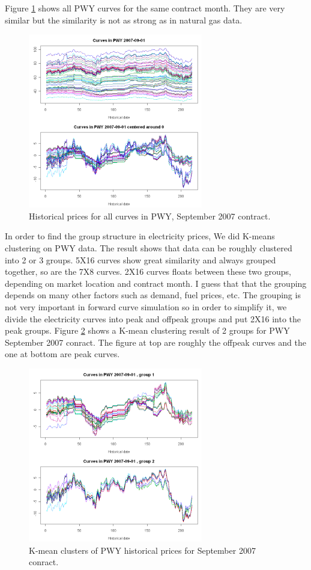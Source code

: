 Figure \ref{pwy-contract} shows all PWY curves for the same contract month.
They are very similar but the similarity is not as strong as in natural
gas data. 
\begin{figure}[htbp]
\centering
\includegraphics[width=3in, height=3in]{figures/pwy-contract.png}
\caption{Historical prices for all curves in PWY, September 2007 contract.}
\label{pwy-contract}
\end{figure}

In order to find the group structure in electricity prices, 
We did K-means clustering on PWY data. The result shows that
data can be roughly clustered into 2 or 3 groups. 5X16
curves show great similarity and always grouped together,
so are the 7X8 curves. 2X16 curves floats between these two groups,
depending on  market location and contract month.
I guess that that the grouping depends on many other factors
such as demand, fuel prices, etc. The grouping is not very 
important in forward curve simulation so in order to simplify it, 
we divide the electricity curves into peak and offpeak groups
and put 2X16 into the peak groups. 
Figure \ref{pwy-kmean} shows a K-mean clustering result of 2 groups
for PWY September 2007 conract. The figure at top are roughly 
the offpeak curves and the one at bottom are peak curves.
\begin{figure}[htbp]
\centering
\includegraphics[width=3in, height=3in]{figures/pwy-kmeans.png}
\caption{K-mean clusters of PWY historical prices for September 2007 conract.}
\label{pwy-kmean}
\end{figure}


